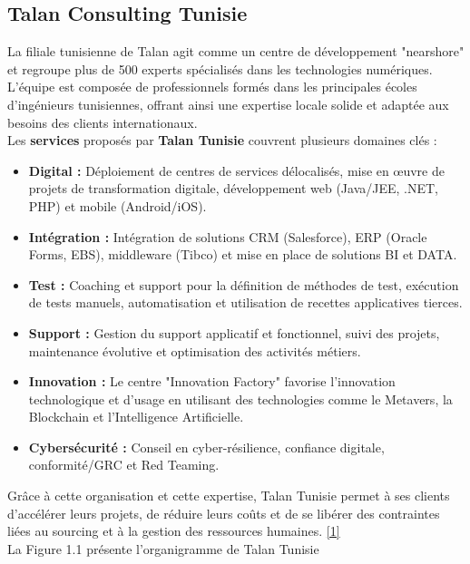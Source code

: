 \subsection{Talan Consulting Tunisie}
La filiale tunisienne de Talan agit comme un centre de développement "nearshore" et regroupe plus de 500 experts spécialisés dans les technologies numériques. L’équipe est composée de professionnels formés dans les principales écoles d’ingénieurs tunisiennes, offrant ainsi une expertise locale solide et adaptée aux besoins des clients internationaux.
\vspace{0.4cm}\\
Les \textbf{services} proposés par \textbf{Talan Tunisie} couvrent plusieurs domaines clés :\\
\begin{itemize}
   

 \item \textbf{ Digital :} Déploiement de centres de services délocalisés, mise en œuvre de projets de transformation digitale, développement web (Java/JEE, .NET, PHP) et mobile (Android/iOS).\\
\item \textbf{Intégration :} Intégration de solutions CRM (Salesforce), ERP (Oracle Forms, EBS), middleware (Tibco) et mise en place de solutions BI et DATA.\\
\item\textbf{ Test : }Coaching et support pour la définition de méthodes de test, exécution de tests manuels, automatisation et utilisation de recettes applicatives tierces.\\
\item \textbf{Support :} Gestion du support applicatif et fonctionnel, suivi des projets, maintenance évolutive et optimisation des activités métiers.\\
\item \textbf{Innovation :} Le centre "Innovation Factory" favorise l’innovation technologique et d’usage en utilisant des technologies comme le Metavers, la Blockchain et l’Intelligence Artificielle.\\
\item \textbf{Cybersécurité :} Conseil en cyber-résilience, confiance digitale, conformité/GRC et Red Teaming.\\
\end{itemize}
Grâce à cette organisation et cette expertise, Talan Tunisie permet à ses clients d’accélérer leurs projets, de réduire leurs coûts et de se libérer des contraintes liées au sourcing et à la gestion des ressources humaines.
\hyperlink{refTalanTunisie}{[1]}\\
La Figure 1.1 présente l’organigramme de Talan Tunisie

